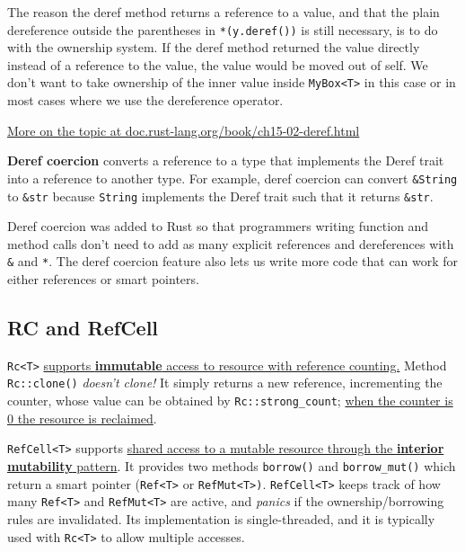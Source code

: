 The reason the deref method returns a reference to a value, and that the plain dereference outside the parentheses in \lstinline|*(y.deref())| is still necessary, is to do with the ownership system. If the deref method returned the value directly instead of a reference to the value, the value would be moved out of self. We don't want to take ownership of the inner value inside \lstinline|MyBox<T>| in this case or in most cases where we use the dereference operator.

\href{https://doc.rust-lang.org/book/ch15-02-deref.html}{More on the topic at doc.rust-lang.org/book/ch15-02-deref.html}

\textbf{Deref coercion} converts a reference to a type that implements the Deref trait into a reference to another type. For example, deref coercion can convert \lstinline|&String| to \lstinline|&str| because \lstinline|String| implements the Deref trait such that it returns \lstinline|&str|.

Deref coercion was added to Rust so that programmers writing function and method calls don't need to add as many explicit references and dereferences with \lstinline|&| and \lstinline|*|. The deref coercion feature also lets us write more code that can work for either references or smart pointers.

\subsection{RC and RefCell}
\lstinline|Rc<T>| \ul{supports \textbf{immutable} access to resource with
reference counting.}
Method \lstinline|Rc::clone()| \emph{doesn't clone!}
It simply returns a new reference, incrementing the counter,
whose value can be obtained by \lstinline|Rc::strong_count|;
\ul{when the counter is 0 the resource is reclaimed}.


\lstinline|RefCell<T>| supports \ul{shared access to a mutable
resource through the \textbf{interior mutability} pattern}.
It provides two methods \lstinline|borrow()| and \lstinline|borrow_mut()| which
return a smart pointer (\lstinline|Ref<T>| or \lstinline|RefMut<T>)|.
\lstinline|RefCell<T>| keeps track of how many \lstinline|Ref<T>| and
\lstinline|RefMut<T>| are active, and \textit{panics} if the
ownership/borrowing rules are invalidated.
Its implementation is single-threaded, and it is typically used with \lstinline|Rc<T>| to allow multiple accesses.

